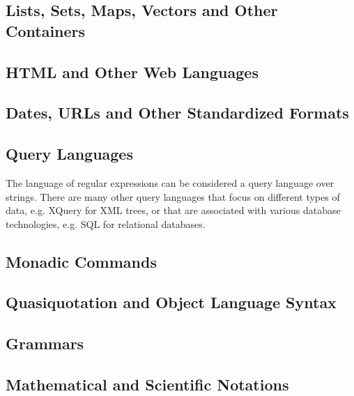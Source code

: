 {{ 


\subsection{Lists, Sets, Maps, Vectors and Other Containers}\label{sec:syntax-examples-containers}
\subsection{HTML and Other Web Languages}\label{sec:syntax-examples-html}
\subsection{Dates, URLs and Other Standardized Formats}\label{sec:syntax-examples-dates}
\subsection{Query Languages} The language of regular expressions can be considered a query language over strings. There are many other query languages that focus on different types of data, e.g. XQuery for XML trees, or that are associated with various database technologies, e.g. SQL for relational databases.  
\subsection{Monadic Commands}\label{sec:syntax-examples-monads}

\subsection{Quasiquotation and Object Language Syntax}\label{sec:syntax-examples-quasiquotation}
\subsection{Grammars}\label{sec:syntax-examples-grammars}
\subsection{Mathematical and Scientific Notations}\label{sec:syntax-examples-math-science}
}}
